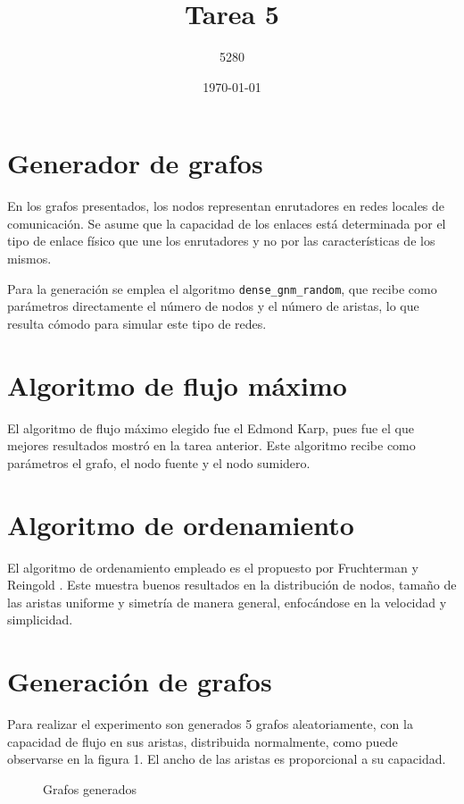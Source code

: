 \documentclass{article}
\title{
Tarea 5
}
\author{5280}
\date{\today}
\begin{document}
\maketitle

\section*{Generador de grafos} 

En los grafos presentados, los nodos representan enrutadores en redes locales de comunicación. Se asume que la capacidad de los enlaces está determinada por el tipo de enlace físico que une los  enrutadores y no por las características de los mismos. 

Para la generación se emplea el algoritmo \texttt{dense\_gnm\_random}, que recibe como parámetros directamente el número de nodos y el número de aristas, lo que resulta cómodo para simular este tipo de redes.

\section*{Algoritmo de flujo máximo}

El algoritmo de flujo máximo elegido fue el Edmond Karp, pues fue el que mejores resultados mostró en la tarea anterior. Este algoritmo recibe como parámetros el grafo, el nodo fuente y el nodo sumidero.

\section*{Algoritmo de ordenamiento}

El algoritmo de ordenamiento empleado es el propuesto por Fruchterman y Reingold \citep{fruchterman1991graph}. Este muestra buenos resultados en la distribución de nodos, tamaño de las aristas uniforme y simetría de manera general, enfocándose en la velocidad y simplicidad.

\section*{Generación de grafos}

Para realizar el experimento son generados 5 grafos aleatoriamente, con la capacidad de flujo en sus aristas, distribuida normalmente, como puede observarse en la figura 1. El ancho de las aristas es proporcional a su capacidad. 

\begin{figure}[htbp]
\centering
{}
\caption{Grafos generados}
\label{Grafos} 
\end{figure}
\end{document}
